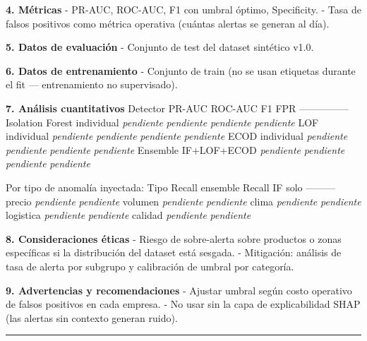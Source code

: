 \textbf{4. Métricas} - PR-AUC, ROC-AUC, F1 con umbral óptimo,
Specificity. - Tasa de falsos positivos como métrica operativa (cuántas
alertas se generan al día).

\textbf{5. Datos de evaluación} - Conjunto de test del dataset sintético
v1.0.

\textbf{6. Datos de entrenamiento} - Conjunto de train (no se usan
etiquetas durante el fit --- entrenamiento no supervisado).

\textbf{7. Análisis cuantitativos} \textbar{} Detector \textbar{} PR-AUC
\textbar{} ROC-AUC \textbar{} F1 \textbar{} FPR \textbar{}
\textbar---\textbar---\textbar---\textbar---\textbar---\textbar{}
\textbar{} Isolation Forest individual \textbar{} \emph{pendiente}
\textbar{} \emph{pendiente} \textbar{} \emph{pendiente} \textbar{}
\emph{pendiente} \textbar{} \textbar{} LOF individual \textbar{}
\emph{pendiente} \textbar{} \emph{pendiente} \textbar{} \emph{pendiente}
\textbar{} \emph{pendiente} \textbar{} \textbar{} ECOD individual
\textbar{} \emph{pendiente} \textbar{} \emph{pendiente} \textbar{}
\emph{pendiente} \textbar{} \emph{pendiente} \textbar{} \textbar{}
Ensemble IF+LOF+ECOD \textbar{} \emph{pendiente} \textbar{}
\emph{pendiente} \textbar{} \emph{pendiente} \textbar{} \emph{pendiente}
\textbar{}

Por tipo de anomalía inyectada: \textbar{} Tipo \textbar{} Recall
ensemble \textbar{} Recall IF solo \textbar{}
\textbar---\textbar---\textbar---\textbar{} \textbar{} precio \textbar{}
\emph{pendiente} \textbar{} \emph{pendiente} \textbar{} \textbar{}
volumen \textbar{} \emph{pendiente} \textbar{} \emph{pendiente}
\textbar{} \textbar{} clima \textbar{} \emph{pendiente} \textbar{}
\emph{pendiente} \textbar{} \textbar{} logistica \textbar{}
\emph{pendiente} \textbar{} \emph{pendiente} \textbar{} \textbar{}
calidad \textbar{} \emph{pendiente} \textbar{} \emph{pendiente}
\textbar{}

\textbf{8. Consideraciones éticas} - Riesgo de sobre-alerta sobre
productos o zonas específicas si la distribución del dataset está
sesgada. - Mitigación: análisis de tasa de alerta por subgrupo y
calibración de umbral por categoría.

\textbf{9. Advertencias y recomendaciones} - Ajustar umbral según costo
operativo de falsos positivos en cada empresa. - No usar sin la capa de
explicabilidad SHAP (las alertas sin contexto generan ruido).

\begin{center}\rule{0.5\linewidth}{0.5pt}\end{center}

